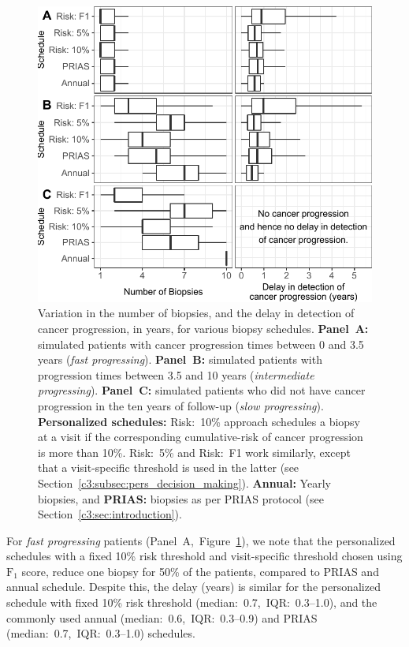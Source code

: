 \begin{figure}
\includegraphics{contents/c3/images/c3_fig6.pdf}
\caption{Variation in the number of biopsies, and the delay in detection of cancer progression, in years, for various biopsy schedules. \textbf{Panel~A:} simulated patients with cancer progression times between 0 and 3.5 years (\emph{fast progressing}). \textbf{Panel~B:} simulated patients with progression times between 3.5 and 10 years (\emph{intermediate progressing}). \textbf{Panel~C:} simulated patients who did not have cancer progression in the ten years of follow-up (\emph{slow progressing}). \textbf{Personalized schedules:} Risk:~10\% approach schedules a biopsy at a visit if the corresponding cumulative-risk of cancer progression is more than 10\%. Risk:~5\% and Risk:~F1 work similarly, except that a visit-specific threshold is used in the latter (see Section~\ref{c3:subsec:pers_decision_making}). \textbf{Annual:} Yearly biopsies, and \textbf{PRIAS:} biopsies as per PRIAS protocol (see Section~\ref{c3:sec:introduction}).}
\label{c3:fig:6}
\end{figure}

For \emph{fast progressing} patients (Panel~A,~Figure~\ref{c3:fig:6}), we note that the personalized schedules with a fixed 10\% risk threshold and visit-specific threshold chosen using $\mbox{F}_1$ score, reduce one biopsy for 50\% of the patients, compared to PRIAS and annual schedule. Despite this, the delay (years) is similar for the personalized schedule with fixed 10\% risk threshold (median:~0.7,~IQR:~0.3--1.0), and the commonly used annual (median:~0.6,~IQR:~0.3--0.9) and PRIAS (median:~0.7,~IQR:~0.3--1.0) schedules.

